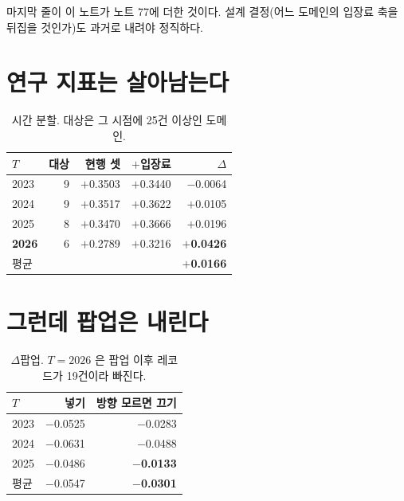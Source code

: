 \documentclass[10pt]{article}
\begin{document}
마지막 줄이 이 노트가 노트 77에 더한 것이다. 설계 결정(어느 도메인의 입장료
축을 뒤집을 것인가)도 과거로 내려야 정직하다.

\section{연구 지표는 살아남는다}

\begin{table}[t]
\centering\tsize
\caption{시간 분할. 대상은 그 시점에 25건 이상인 도메인.}
\begin{tabular}{lrrrr}
\toprule
$T$ & 대상 & 현행 셋 & $+$입장료 & $\Delta$ \\
\midrule
2023 & 9 & $+$0.3503 & $+$0.3440 & $-$0.0064 \\
2024 & 9 & $+$0.3517 & $+$0.3622 & $+$0.0105 \\
2025 & 8 & $+$0.3470 & $+$0.3666 & $+$0.0196 \\
\textbf{2026} & 6 & $+$0.2789 & $+$0.3216 & \textbf{$+$0.0426} \\
\midrule
\multicolumn{4}{l}{평균} & \textbf{$+$0.0166} \\
\bottomrule
\end{tabular}
\end{table}


\section{그런데 팝업은 내린다}

\begin{table}[t]
\centering\tsize
\caption{$\Delta$팝업. $T{=}2026$ 은 팝업 이후 레코드가 19건이라 빠진다.}
\begin{tabular}{lrr}
\toprule
$T$ & 넣기 & 방향 모르면 끄기 \\
\midrule
2023 & $-$0.0525 & $-$0.0283 \\
2024 & $-$0.0631 & $-$0.0488 \\
2025 & $-$0.0486 & \textbf{$-$0.0133} \\
\midrule
평균 & $-$0.0547 & \textbf{$-$0.0301} \\
\bottomrule
\end{tabular}
\end{table}
\end{document}
